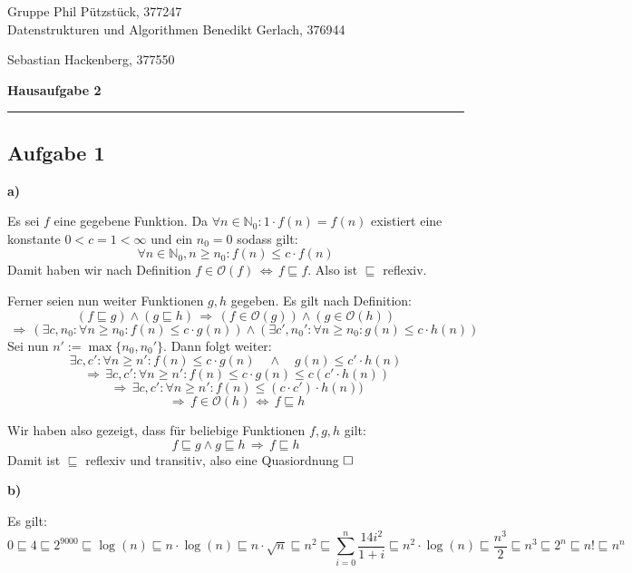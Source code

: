 \documentclass[a4paper,graphics,11pt]{article}
\newcommand{\aufgabe}[1]{\subsection*{Aufgabe #1}}
\begin{document}
\noindent Gruppe              \hfill Phil Pützstück, 377247\\
\noindent Datenstrukturen und Algorithmen \hfill Benedikt Gerlach, 376944\\
\strut\hfill Sebastian Hackenberg, 377550\\
\begin{center}
	\LARGE{\textbf{Hausaufgabe 2}}
\end{center}
\begin{center}
\rule[0.1ex]{\textwidth}{1pt}
\end{center}

\aufgabe{1}
\textbf{a)}

Es sei $f$ eine gegebene Funktion. Da $\forall n \in \mathbb{N}_0: 1\cdot f(n) = f(n)$
existiert eine konstante $0 < c = 1 < \infty$ und ein $n_0 = 0$ sodass gilt:
$$
	\forall n \in \mathbb{N}_0, n \geq n_0 : f(n) \leq c \cdot f(n)
$$
Damit haben wir nach Definition $f \in \mathcal{O}(f) \,\Longleftrightarrow\, f \sqsubseteq f$.
Also ist $\sqsubseteq$ reflexiv.

Ferner seien nun weiter Funktionen $g,h$ gegeben. Es gilt nach Definition:
$$
	(f \sqsubseteq g) \land (g \sqsubseteq h)
	\,\Longrightarrow\, (f \in \mathcal{O}(g)) \land (g \in \mathcal{O}(h))
$$$$
	\,\Longrightarrow\, (\exists c,n_0 : \forall n \geq n_0 : f(n) \leq c \cdot g(n)) \land 
		(\exists c',n_0' : \forall n \geq n_0 : g(n) \leq c \cdot h(n))
$$
Sei nun $n' := \max \{n_0, n_0'\}$. Dann folgt weiter:
$$
	\exists c,c' : \forall n \geq n' : f(n) \leq c \cdot g(n)\quad \land\quad g(n) \leq c' \cdot h(n)
$$$$
	\,\Longrightarrow\, \exists c,c' : \forall n \geq n' : f(n) \leq c\cdot g(n) \leq c (c'\cdot h(n))
$$$$
	\,\Longrightarrow\, \exists c,c' : \forall n \geq n' : f(n) \leq (c\cdot c')\cdot h(n))
$$$$
	\,\Longrightarrow\, f \in \mathcal{O}(h) \,\Longleftrightarrow\, f \sqsubseteq h
$$

Wir haben also gezeigt, dass für beliebige Funktionen $f,g,h$ gilt:
$$
	f \sqsubseteq g \land g \sqsubseteq h \,\Longrightarrow\, f \sqsubseteq h
$$
Damit ist $\sqsubseteq$ reflexiv und transitiv, also eine Quasiordnung $\hfill\square$

\textbf{b)}

Es gilt:
$$
	0 \sqsubseteq 4 \sqsubseteq 2^{9000} \sqsubseteq \log(n) \sqsubseteq n\cdot\log(n) \sqsubseteq n\cdot \sqrt{n} \sqsubseteq n^2 \sqsubseteq \sum_{i=0}^{n} \frac{14i^2}{1+i} \sqsubseteq n^2\cdot\log(n) \sqsubseteq \frac{n^3}{2} \sqsubseteq n^3 \sqsubseteq 2^n \sqsubseteq n! \sqsubseteq n^n
$$
\newpage
\end{document}
